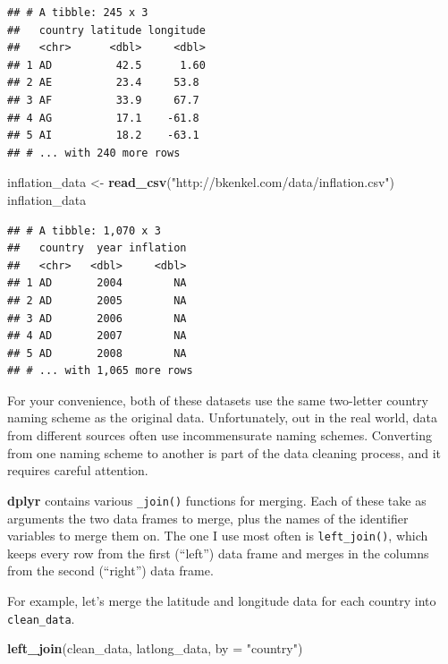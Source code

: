 \documentclass[12pt,oneside,openany]{book}
\newenvironment{Shaded}{\begin{snugshade}}{\end{snugshade}}
\newcommand{\KeywordTok}[1]{\textcolor[rgb]{0.13,0.29,0.53}{\textbf{#1}}}
\newcommand{\DataTypeTok}[1]{\textcolor[rgb]{0.13,0.29,0.53}{#1}}
\newcommand{\StringTok}[1]{\textcolor[rgb]{0.31,0.60,0.02}{#1}}
\newcommand{\NormalTok}[1]{#1}
\begin{document}
\begin{verbatim}
## # A tibble: 245 x 3
##   country latitude longitude
##   <chr>      <dbl>     <dbl>
## 1 AD          42.5      1.60
## 2 AE          23.4     53.8 
## 3 AF          33.9     67.7 
## 4 AG          17.1    -61.8 
## 5 AI          18.2    -63.1 
## # ... with 240 more rows
\end{verbatim}

\begin{Shaded}
\begin{Highlighting}[]
\NormalTok{inflation_data <-}\StringTok{ }\KeywordTok{read_csv}\NormalTok{(}\StringTok{"http://bkenkel.com/data/inflation.csv"}\NormalTok{)}
\NormalTok{inflation_data}
\end{Highlighting}
\end{Shaded}

\begin{verbatim}
## # A tibble: 1,070 x 3
##   country  year inflation
##   <chr>   <dbl>     <dbl>
## 1 AD       2004        NA
## 2 AD       2005        NA
## 3 AD       2006        NA
## 4 AD       2007        NA
## 5 AD       2008        NA
## # ... with 1,065 more rows
\end{verbatim}

For your convenience, both of these datasets use the same two-letter
country naming scheme as the original data. Unfortunately, out in the
real world, data from different sources often use incommensurate naming
schemes. Converting from one naming scheme to another is part of the
data cleaning process, and it requires careful attention.

\textbf{dplyr} contains various \texttt{\_join()} functions for merging.
Each of these take as arguments the two data frames to merge, plus the
names of the identifier variables to merge them on. The one I use most
often is \texttt{left\_join()}, which keeps every row from the first
(``left'') data frame and merges in the columns from the second
(``right'') data frame.

For example, let's merge the latitude and longitude data for each
country into \texttt{clean\_data}.

\begin{Shaded}
\begin{Highlighting}[]
\KeywordTok{left_join}\NormalTok{(clean_data,}
\NormalTok{          latlong_data,}
          \DataTypeTok{by =} \StringTok{"country"}\NormalTok{)}
\end{Highlighting}
\end{Shaded}
\end{document}

